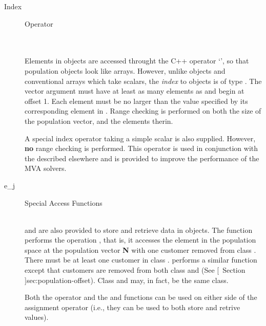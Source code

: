 \begin{description}
\item[Index] \texonly{---} Operator\\
  \\
  \\

  Elements in  objects are accessed throught the C++
  operator `\code{[]}', so that population objects look like arrays.
  However, unlike  objects and conventional arrays which
  take scalars, the \emph{index} to  objects is of type
  .  The vector argument must have at least as
  many elements as  and begin
  at offset 1.  Each element must be no larger than the value specified
  by its corresponding element in
  .  Range checking is
  performed on both the size of the population vector, and the elements
  therin.

  A special index operator taking a simple scalar  is also
  supplied.  However, {\bf no} range checking is performed.  This
  operator is used in conjunction with the  described elsewhere and is provided
  to improve the performance of the MVA solvers.

\item[e\_j] \texonly{---} Special Access Functions\\
  \\

   and  are also provided to store and
  retrieve data in  objects.  The  function
  performs the operation , that is, it accesses the
  element in the population space at the population vector {\bf N} with
  one customer removed from class .  There must be at least one
  customer in class .   performs a similar
  function except that customers are removed from both class  and
   (See [~Section
  \Ref]{sec:population-offset}).  Class  and  may, in
  fact, be the same class.

  Both the \code{[]} operator and the  and 
  functions can be used on either side of the assignment operator (i.e.,
  they can be used to both store and retrive values).
\end{description}

